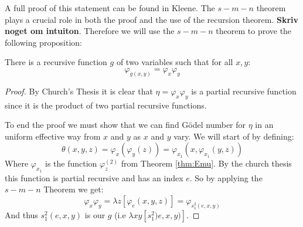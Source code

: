 \documentclass[../main.tex]{subfiles}
\begin{document}
A full proof of this statement can be found in Kleene. The $s-m-n$ theorem
plays a crucial role in both the proof and the use of the recursion theorem.
\textbf{Skriv noget om intuiton}. Therefore we will use the $s-m-n$ theorem to
prove the following proposition:
\begin{prop}
	There is a recursive function $g$ of two variables such that for all
	$x,y$:
\[\varphi_{g(x,y)}=\varphi_x\varphi_y\]
\end{prop}
\begin{proof}
	By Church's Thesis it is clear that $\eta=\varphi_x\varphi_y$ is a
	partial recursive function since it is the product of two partial
	recursive functions.

	To end the proof we must show that we can find Gödel number for $\eta$
	in an uniform effective way from $x$ and $y$ as $x$ and $y$ vary. We
	will start of by defining:
	\[\theta(x,y,z)=\varphi_x(\varphi_y(z))=\varphi_{x_1}(x,\varphi_{x_1}(y,z))\]
	Where $\varphi_{x_1}$ is the function $\varphi_z^{(2)}$ from Theorem
	\ref{thm:Emu}. By the church thesis this function is partial recursive
	and has an index $e$. So by applying the $s-m-n$ Theorem we get:
	\[\varphi_x\varphi_y=\lambda
	z[\varphi_e(x,y,z)]=\varphi_{s_1^2(e,x,y)}\]
	And thus $s_1^2(e,x,y)$ is our $g$ (i.e $\lambda xy[s_1^2)e,x,y)]$.
\end{proof}
\end{document}
